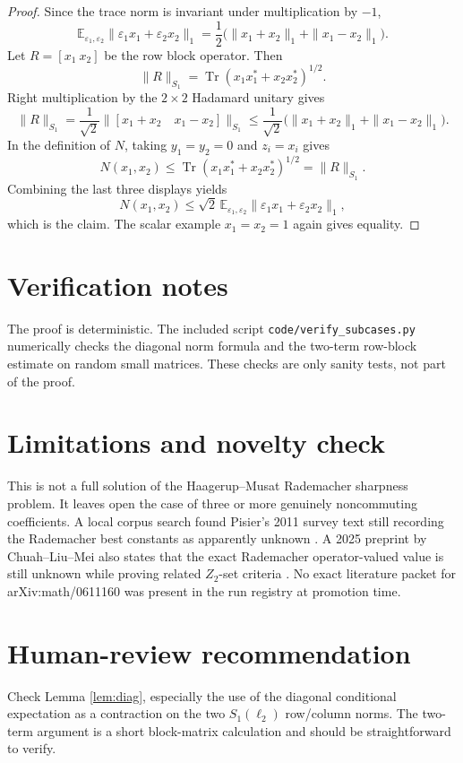 \documentclass[11pt]{article}
\newcommand{\Tr}{\operatorname{Tr}}
\newcommand{\E}{\mathbb E}
\newcommand{\eps}{\varepsilon}
\begin{document}
\begin{proof}
Since the trace norm is invariant under multiplication by \(-1\),
\[
\E_{\eps_1,\eps_2}\|\eps_1x_1+\eps_2x_2\|_1
=\frac12\bigl(\|x_1+x_2\|_1+\|x_1-x_2\|_1\bigr).
\]
Let \(R=[x_1\ x_2]\) be the row block operator.  Then
\[
\|R\|_{S_1}=\Tr(x_1x_1^*+x_2x_2^*)^{1/2}.
\]
Right multiplication by the \(2\times2\) Hadamard unitary gives
\[
\|R\|_{S_1}
=
\frac1{\sqrt2}\|[x_1+x_2\quad x_1-x_2]\|_{S_1}
\leq
\frac1{\sqrt2}\bigl(\|x_1+x_2\|_1+\|x_1-x_2\|_1\bigr).
\]
In the definition of \(N\), taking \(y_1=y_2=0\) and \(z_i=x_i\)
gives
\[
N(x_1,x_2)\leq \Tr(x_1x_1^*+x_2x_2^*)^{1/2}=\|R\|_{S_1}.
\]
Combining the last three displays yields
\[
N(x_1,x_2)
\leq
\sqrt2\,
\E_{\eps_1,\eps_2}\|\eps_1x_1+\eps_2x_2\|_1,
\]
which is the claim.  The scalar example \(x_1=x_2=1\) again gives
equality.
\end{proof}

\section*{Verification notes}

The proof is deterministic.  The included script
\texttt{code/verify\_subcases.py} numerically checks the diagonal norm
formula and the two-term row-block estimate on random small matrices.
These checks are only sanity tests, not part of the proof.

\section*{Limitations and novelty check}

This is not a full solution of the Haagerup--Musat Rademacher sharpness
problem.  It leaves open the case of three or more genuinely
noncommuting coefficients.  A local corpus search found Pisier's 2011
survey text still recording the Rademacher best constants as apparently
unknown \cite{PisierSurvey}.  A 2025 preprint by Chuah--Liu--Mei also
states that the exact Rademacher operator-valued value is still unknown
while proving related \(Z_2\)-set criteria \cite{CLM}.  No exact
literature packet for arXiv:math/0611160 was present in the run
registry at promotion time.

\section*{Human-review recommendation}

Check Lemma \ref{lem:diag}, especially the use of the diagonal
conditional expectation as a contraction on the two \(S_1(\ell_2)\)
row/column norms.  The two-term argument is a short block-matrix
calculation and should be straightforward to verify.
\end{document}
